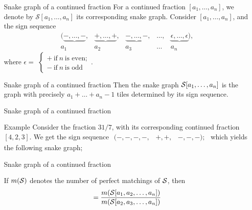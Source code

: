 \documentclass{beamer}
\def\s{\ensuremath\mathcal{S}}
\begin{document}
\begin{frame}{Snake graph of a continued fraction}
For a continued fraction $[a_1,\dots,a_n]$, we denote by $\mathcal{S}[a_1,\dots,a_n]$ its corresponding snake graph. Consider $[a_1,\dots,a_n]$, and the sign sequence 
\begin{equation}\label{signsequence}
\begin{array}{cccccccc}
  ( \underbrace{ -,\ldots,-},&  \underbrace{ + ,\dots, +},&  \underbrace{ -,\ldots,-},& \ldots,&  \underbrace{\epsilon,\ldots,\epsilon}) ,  \\
 a_1 & a_2 & a_3&\ldots&a_n
\end{array} 
\end{equation}
where $\epsilon = $
$
\begin{cases}
+  \ \text{if} \ n \ \text{is even}; \\
- \ \text{if} \ n \ \text{is odd}
\end{cases}.
$
\end{frame}
\begin{frame}{Snake graph of a continued fraction}
    Then the snake graph $\s[a_1,\dots,a_n]$ is the graph with precisely $a_1 + \dots + a_n - 1$ tiles determined by its sign sequence.
\end{frame}
\begin{frame}{Snake graph of a continued fraction}
    \begin{exampleblock}{Example}
Consider the fraction $31/7$, with its corresponding continued fraction \pause $[4,2,3]$. We get the sign sequence \pause
$
\begin{array}{ccc}
  ( -,-,-,-,&  +,+,&  -,-,-);
\end{array}
$
which yields the following snake graph;
\pause
\begin{figure}[H]
    \centering
\end{figure}
\end{exampleblock}
\end{frame}
\begin{frame}{Snake graph of a continued fraction}
    \begin{theorem}
        If $m(\s)$ denotes the number of perfect matchings of $\s$, then \pause
        \begin{equation*}
            [a_1,a_2,\dots,a_n] = \dfrac{m(\s[a_1,a_2,\dots,a_n])}{m(\s[a_2,a_3,\dots,a_n])}
        \end{equation*}
    \end{theorem}
\end{frame}
\end{document}
